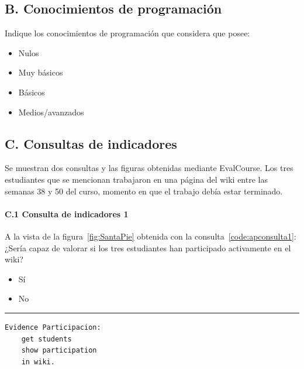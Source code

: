 	\subsection*{B. Conocimientos de programación}

\begin{mdframed}[style=cuestionarioST]
			Indique los conocimientos de programación que considera que posee:
			\begin{itemize}
				\item Nulos
				\item Muy básicos
				\item Básicos
				\item Medios/avanzados
			\end{itemize}
\end{mdframed}

	

	\subsection*{C. Consultas de indicadores}

\begin{mdframed}[style=cuestionarioST]
	Se muestran dos consultas y las figuras obtenidas mediante EvalCourse. Los tres estudiantes que se mencionan trabajaron en una página del wiki entre las semanas 38 y 50 del curso, momento en que el trabajo debía estar terminado.
\end{mdframed}

\newpage

	\paragraph*{C.1 Consulta de indicadores 1}

\begin{mdframed}[style=cuestionarioST]
			A la vista de la figura~\ref{fig:SantaPie} obtenida con la consulta~\ref{code:apconsulta1}: ¿Sería capaz de valorar si los tres estudiantes han participado activamente en el wiki?
			\begin{itemize}
				\item Sí
				\item No
			\end{itemize}

			\rule{30mm}{1pt} \newline
\begin{lstlisting}[caption=Consulta participación de los estudiantes en el wiki,label=code:apconsulta1, captionpos=b, morekeywords={Evidence,get, students, show, milestones, participation, access, in, assignment, forum, campus, wiki, between, and, workshop, interaction, assessment, grade, from, course, backup}]
Evidence Participacion: 
	get students 
	show participation 
	in wiki.
\end{lstlisting}
\end{mdframed}

